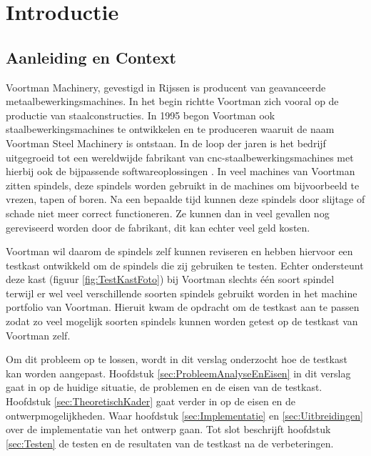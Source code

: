 \section{Introductie}


\subsection{Aanleiding en Context}

Voortman Machinery, gevestigd in Rijssen is producent van geavanceerde metaalbewerkingsmachines. In het begin richtte Voortman zich vooral op de productie van staalconstructies. In 1995 begon Voortman ook staalbewerkingsmachines te ontwikkelen en te produceren waaruit de naam Voortman Steel Machinery is ontstaan. In de loop der jaren is het bedrijf uitgegroeid tot een wereldwijde fabrikant van \gls{cnc}-staalbewerkingsmachines met hierbij ook de bijpassende softwareoplossingen \cite{web:VoortmanGeschiedenis}. In veel machines van Voortman zitten spindels, deze spindels worden gebruikt in de machines om bijvoorbeeld te vrezen, tapen of boren. Na een bepaalde tijd kunnen deze spindels door slijtage of schade niet meer correct functioneren. Ze kunnen dan in veel gevallen nog gereviseerd worden door de fabrikant, dit kan echter veel geld kosten.
 
\vspace{0.5cm}
 
  Voortman wil daarom de spindels zelf kunnen reviseren en hebben hiervoor een testkast ontwikkeld om de spindels die zij gebruiken te testen. Echter ondersteunt deze kast (figuur \ref{fig:TestKastFoto}) bij Voortman slechts één soort spindel terwijl er wel veel verschillende soorten spindels gebruikt worden in het machine portfolio van Voortman. Hieruit kwam de opdracht om de testkast aan te passen zodat zo veel mogelijk soorten spindels kunnen worden getest op de testkast van Voortman zelf.
  
\vspace{0.5cm}

Om dit probleem op te lossen, wordt in dit verslag onderzocht hoe de testkast kan worden aangepast. Hoofdstuk \ref{sec:ProbleemAnalyseEnEisen} in dit verslag gaat in op de huidige situatie, de problemen en de eisen van de testkast. Hoofdstuk \ref{sec:TheoretischKader} gaat verder in op de eisen en de ontwerpmogelijkheden. Waar hoofdstuk \ref{sec:Implementatie} en \ref{sec:Uitbreidingen} over de implementatie van het ontwerp gaan. Tot slot beschrijft hoofdstuk \ref{sec:Testen} de testen en de resultaten van de testkast na de verbeteringen.

